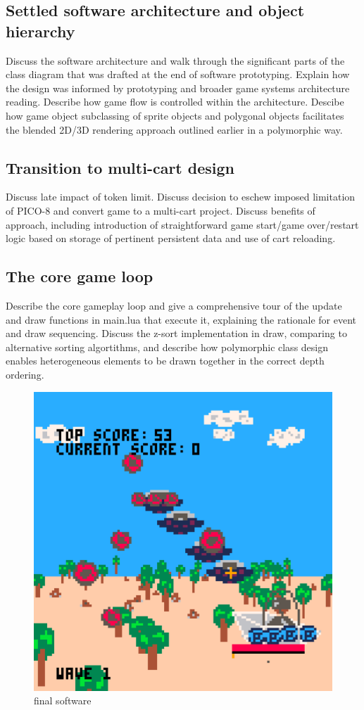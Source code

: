 \documentclass{article}
\begin{document}
\subsection{Settled software architecture and object hierarchy}
Discuss the software architecture and walk through the significant parts of the
class diagram that was drafted at the end of software prototyping. Explain how the
design was informed by prototyping and broader game systems architecture reading.
Describe how game flow is controlled within the architecture. Descibe how game object
subclassing of sprite objects and polygonal objects facilitates the blended
2D/3D rendering approach outlined earlier in a polymorphic way. 

\subsection{Transition to multi-cart design}\label{multicart}
Discuss late impact of token limit. Discuss decision to eschew imposed limitation of
PICO-8 and convert game to a multi-cart project. Discuss benefits of approach, including
introduction of straightforward game start/game over/restart logic based on storage of
pertinent persistent data and use of cart reloading. 

\subsection{The core game loop}
Describe the core gameplay loop and give a comprehensive tour of the update and draw
functions in main.lua that execute it, explaining the rationale for event and draw
sequencing. Discuss the z-sort implementation in draw, comparing to alternative sorting
algortithms, and describe how polymorphic class design enables heterogeneous elements
to be drawn together in the correct depth ordering.

\begin{figure}[h]
    \centering
    \includegraphics[width=.8\textwidth]{final3d}
    \caption{final software}
    \label{fig:3dfinal}
\end{figure}
\end{document}
